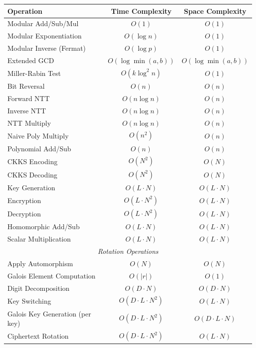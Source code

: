 \documentclass[11pt,a4paper]{article}
\begin{document}
\begin{center}
\begin{tabular}{lcc}
\toprule
\textbf{Operation} & \textbf{Time Complexity} & \textbf{Space Complexity} \\
\midrule
Modular Add/Sub/Mul & $O(1)$ & $O(1)$ \\
Modular Exponentiation & $O(\log n)$ & $O(1)$ \\
Modular Inverse (Fermat) & $O(\log p)$ & $O(1)$ \\
Extended GCD & $O(\log \min(a,b))$ & $O(\log \min(a,b))$ \\
Miller-Rabin Test & $O(k \log^2 n)$ & $O(1)$ \\
Bit Reversal & $O(n)$ & $O(n)$ \\
Forward NTT & $O(n \log n)$ & $O(n)$ \\
Inverse NTT & $O(n \log n)$ & $O(n)$ \\
NTT Multiply & $O(n \log n)$ & $O(n)$ \\
Naive Poly Multiply & $O(n^2)$ & $O(n)$ \\
Polynomial Add/Sub & $O(n)$ & $O(n)$ \\
\midrule
CKKS Encoding & $O(N^2)$ & $O(N)$ \\
CKKS Decoding & $O(N^2)$ & $O(N)$ \\
Key Generation & $O(L \cdot N)$ & $O(L \cdot N)$ \\
Encryption & $O(L \cdot N^2)$ & $O(L \cdot N)$ \\
Decryption & $O(L \cdot N^2)$ & $O(L \cdot N)$ \\
Homomorphic Add/Sub & $O(L \cdot N)$ & $O(L \cdot N)$ \\
Scalar Multiplication & $O(L \cdot N)$ & $O(L \cdot N)$ \\
\midrule
\multicolumn{3}{c}{\textit{Rotation Operations}} \\
\midrule
Apply Automorphism & $O(N)$ & $O(N)$ \\
Galois Element Computation & $O(|r|)$ & $O(1)$ \\
Digit Decomposition & $O(D \cdot N)$ & $O(D \cdot N)$ \\
Key Switching & $O(D \cdot L \cdot N^2)$ & $O(L \cdot N)$ \\
Galois Key Generation (per key) & $O(D \cdot L \cdot N^2)$ & $O(D \cdot L \cdot N)$ \\
Ciphertext Rotation & $O(D \cdot L \cdot N^2)$ & $O(L \cdot N)$ \\
\bottomrule
\end{tabular}
\end{center}
\end{document}
